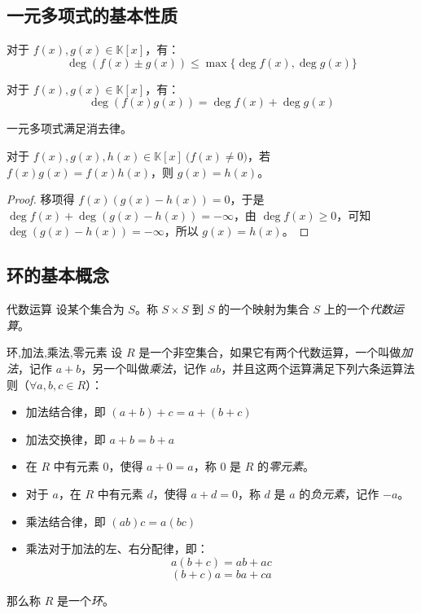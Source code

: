 \subsection{一元多项式的基本性质}

\begin{proposition}
	对于 $f(x), g(x) \in \mathbb K[x]$，有：
	$$
	\deg(f(x) \pm g(x)) \le \max \{ \deg f(x), \deg g(x) \}
	$$
\end{proposition}

\begin{proposition}
	对于 $f(x), g(x) \in \mathbb K[x]$，有：
	$$
	\deg(f(x) g(x)) = \deg f(x) + \deg g(x)
	$$
\end{proposition}

一元多项式满足消去律。

\begin{proposition}
	对于 $f(x), g(x), h(x) \in \mathbb K[x] \pod{f(x) \ne 0}$，若 $f(x) g(x) = f(x) h(x)$，则 $g(x) = h(x)$。
\end{proposition}

\begin{proof}
	移项得 $f(x)(g(x) - h(x)) = 0$，于是 $\deg f(x) + \deg(g(x) - h(x)) = - \infty$，由 $\deg f(x) \ge 0$，可知 $\deg(g(x) - h(x)) = -\infty$，所以 $g(x) = h(x)$。
\end{proof}

\subsection{环的基本概念}

\begin{definition}{代数运算}
	设某个集合为 $S$。称 $S \times S$ 到 $S$ 的一个映射为集合 $S$ 上的一个\emph{代数运算}。
\end{definition}

\begin{definition}{环,加法,乘法,零元素}
	设 $R$ 是一个非空集合，如果它有两个代数运算，一个叫做\emph{加法}，记作 $a + b$，另一个叫做\emph{乘法}，记作 $ab$，并且这两个运算满足下列六条运算法则（$\forall a, b, c \in R$）：
	\begin{itemize}
		\item 加法结合律，即 $(a + b) + c = a + (b + c)$
		\item 加法交换律，即 $a + b = b + a$
		\item 在 $R$ 中有元素 $0$，使得 $a + 0 = a$，称 $0$ 是 $R$ 的\emph{零元素}。
		\item 对于 $a$，在 $R$ 中有元素 $d$，使得 $a + d = 0$，称 $d$ 是 $a$ 的\emph{负元素}，记作 $-a$。
		\item 乘法结合律，即 $(ab)c = a(bc)$
		\item 乘法对于加法的左、右分配律，即：
		$$
		a(b + c) = ab + ac
		$$$$
		(b + c) a = ba + ca
		$$
	\end{itemize}
	那么称 $R$ 是一个\emph{环}。
\end{definition}

